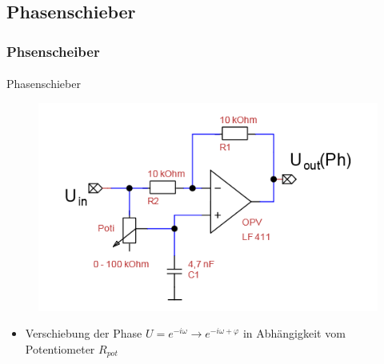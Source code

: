 \subsection{Phasenschieber} %
\label{sub:Phasenschieber}
\begin{frame}
\frametitle{Phsenscheiber}
\framesubtitle{}
    \begin{block}{Phasenschieber}
         \begin{figure}[H]
         \begin{center}
                 \includegraphics[scale=0.4]{./img/schaltung/Phasenschieber.png}
         \end{center}
         \end{figure}
         \begin{itemize}
             \item Verschiebung der Phase $U = e^{-i\omega} \rightarrow e^{-i
             \omega + \varphi}$ in Abhängigkeit vom Potentiometer $R_{pot}$
         \end{itemize}
    \end{block}
\end{frame}
